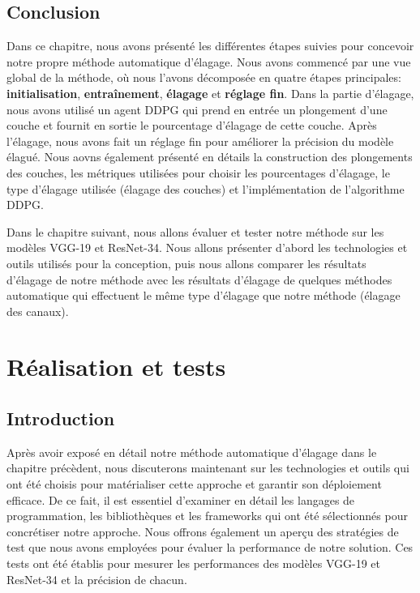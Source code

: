 \section{Conclusion}
Dans ce chapitre, nous avons présenté les différentes étapes suivies pour concevoir notre propre méthode automatique d'élagage. Nous avons commencé par une vue global de la méthode, où nous l'avons décomposée en quatre étapes principales: \textbf{initialisation}, \textbf{entraînement}, \textbf{élagage} et \textbf{réglage fin}. Dans la partie d'élagage, nous avons utilisé un agent DDPG qui prend en entrée un plongement d'une couche et fournit en sortie le pourcentage d'élagage de cette couche. Après l'élagage, nous avons fait un réglage fin pour améliorer la précision du modèle élagué. Nous aovns également présenté en détails la construction des plongements des couches, les métriques utilisées pour choisir les pourcentages d'élagage, le type d'élagage utilisée (élagage des couches) et l'implémentation de l'algorithme DDPG.

Dans le chapitre suivant, nous allons évaluer et tester notre méthode sur les modèles VGG-19 et ResNet-34. Nous allons présenter d'abord les technologies et outils utilisés pour la conception, puis nous allons comparer les résultats d'élagage de notre méthode avec les résultats d'élagage de quelques méthodes automatique qui effectuent le même type d'élagage que notre méthode (élagage des canaux).






\chapter{Réalisation et tests}
\section{Introduction}
Après avoir exposé en détail notre méthode automatique d'élagage dans le chapitre précèdent, nous discuterons maintenant sur les technologies et outils qui ont été choisis pour matérialiser cette approche et garantir son déploiement efficace. De ce fait, il est essentiel d'examiner en détail les langages de programmation, les bibliothèques et les frameworks qui ont été sélectionnés pour concrétiser notre approche. Nous offrons également un aperçu des stratégies de test que nous avons employées pour évaluer la performance de notre solution. Ces tests ont été établis pour mesurer les performances des modèles VGG-19 et ResNet-34 et la précision de chacun.

